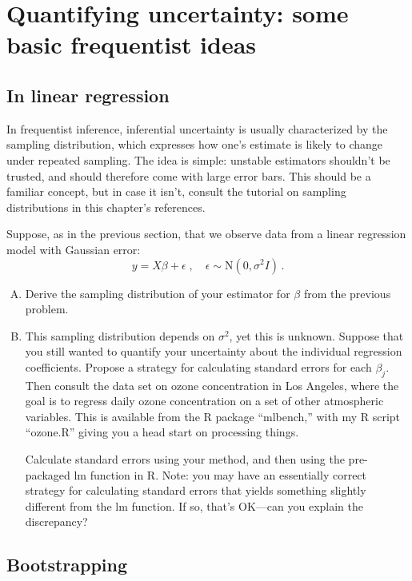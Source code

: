 \documentclass{mynotes}
\newcommand{\N}{\mbox{N}}
\begin{document}
\newpage

\section{Quantifying uncertainty: some basic frequentist ideas}

\subsection{In linear regression}

In frequentist inference, inferential uncertainty is usually characterized by the sampling distribution, which expresses how one's estimate is likely to change under repeated sampling.  The idea is simple: unstable estimators shouldn't be trusted, and should therefore come with large error bars.  This should be a familiar concept, but in case it isn't, consult the tutorial on sampling distributions in this chapter's references.

Suppose, as in the previous section, that we observe data from a linear regression model with Gaussian error:
$$
y = X \beta + \epsilon \; , \quad \epsilon \sim \N(0, \sigma^2 I) \, .
$$

\begin{enumerate}[(A)]

\item Derive the sampling distribution of your estimator for $\beta$ from the previous problem.

\item This sampling distribution depends on $\sigma^2$, yet this is unknown.  Suppose that you still wanted to quantify your uncertainty about the individual regression coefficients.  Propose a strategy for calculating standard errors for each $\beta_j$.  Then consult the data set on ozone concentration in Los Angeles, where the goal is to regress daily ozone concentration on a set of other atmospheric variables.  This is available from the R package ``mlbench,'' with my R script ``ozone.R'' giving you a head start on processing things.

Calculate standard errors using your method, and then using the pre-packaged lm function in R.  Note: you may have an essentially correct strategy for calculating standard errors that yields something slightly different from the lm function.  If so, that's OK---can you explain the discrepancy?

\end{enumerate}

\subsection{Bootstrapping}
\end{document}
